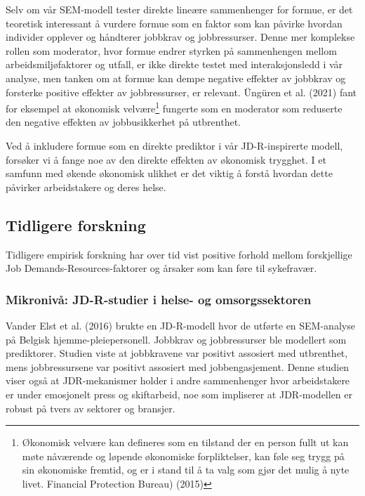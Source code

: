 \documentclass[
  12pt,
  a4paper,
  DIV=11,
  numbers=noendperiod]{scrartcl}
\begin{document}
Selv om vår SEM-modell tester direkte lineære sammenhenger for formue,
er det teoretisk interessant å vurdere formue som en faktor som kan
påvirke hvordan individer opplever og håndterer jobbkrav og
jobbressurser. Denne mer komplekse rollen som moderator, hvor formue
endrer styrken på sammenhengen mellom arbeidsmiljøfaktorer og utfall, er
ikke direkte testet med interaksjonsledd i vår analyse, men tanken om at
formue kan dempe negative effekter av jobbkrav og forsterke positive
effekter av jobbressurser, er relevant. Üngüren et al. (2021) fant for
eksempel at økonomisk velvære\footnote{Økonomisk velvære kan defineres
  som en tilstand der en person fullt ut kan møte nåværende og løpende
  økonomiske forpliktelser, kan føle seg trygg på sin økonomiske
  fremtid, og er i stand til å ta valg som gjør det mulig å nyte livet.
  Financial Protection Bureau) (2015)} fungerte som en moderator som
reduserte den negative effekten av jobbusikkerhet på utbrenthet.

Ved å inkludere formue som en direkte prediktor i vår JD-R-inspirerte
modell, forsøker vi å fange noe av den direkte effekten av økonomisk
trygghet. I et samfunn med økende økonomisk ulikhet er det viktig å
forstå hvordan dette påvirker arbeidstakere og deres helse.

\subsection{Tidligere forskning}\label{tidligere-forskning}

Tidligere empirisk forskning har over tid vist positive forhold mellom
forskjellige Job Demands-Resources-faktorer og årsaker som kan føre til
sykefravær.

\subsubsection{Mikronivå: JD-R-studier i helse- og
omsorgssektoren}\label{mikronivuxe5-jd-r-studier-i-helse--og-omsorgssektoren}

Vander Elst et al. (2016) brukte en JD-R-modell hvor de utførte en
SEM-analyse på Belgisk hjemme-pleiepersonell. Jobbkrav og jobbressurser
ble modellert som prediktorer. Studien viste at jobbkravene var positivt
assosiert med utbrenthet, mens jobbressursene var positivt assosiert med
jobbengasjement. Denne studien viser også at JDR-mekanismer holder i
andre sammenhenger hvor arbeidstakere er under emosjonelt press og
skiftarbeid, noe som impliserer at JDR-modellen er robust på tvers av
sektorer og bransjer.
\end{document}
